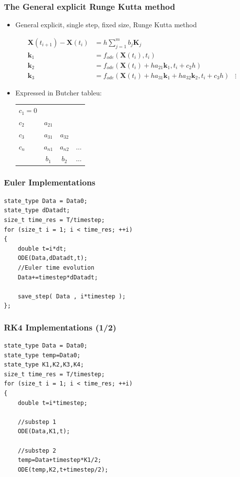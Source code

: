 \documentclass{beamer}
\begin{document}
\begin{frame}
\frametitle{The General explicit Runge Kutta method}
\begin{itemize}

\item<1-> General explicit, single step, fixed size, Runge Kutta method

\begin{align*}
\mathbf{X}(t_{i+1})-\mathbf{X}(t_{i}) &=  h \sum_{j=1}^{m} b_j \mathbf{K}_j\\
\mathbf{k}_1 &= f_{ode}(\mathbf{X}(t_i),t_i)\\
\mathbf{k}_2 &= f_{ode}(\mathbf{X}(t_i)+ha_{21} \mathbf{k}_1,t_i+c_2 h)\\
\mathbf{k}_3 &= f_{ode}(\mathbf{X}(t_i)+ha_{31} \mathbf{k}_1+ha_{32} \mathbf{k}_2,t_i+c_3 h)
&\vdots
\end{align*}

\item<2-> Expressed in Butcher tableu:

\begin{tabular}{l | @{\quad} c @{\quad} c @{\quad} c}
$c_1=0$ \\
$c_2$ & $a_{21}$\\
$c_3$ & $a_{31}$ &  $a_{32}$\\
$c_n$ & $a_{n1}$ &  $a_{n2}$ & $\hdots$\\
\midrule
& $b_1$ & $b_2$ & $\hdots$
\end{tabular}


\end{itemize}
\end{frame}


\begin{frame}[fragile]
\frametitle{Euler Implementations}
\begin{lstlisting}
state_type Data = Data0;
state_type dDatadt;
size_t time_res = T/timestep;
for (size_t i = 1; i < time_res; ++i)
{
    double t=i*dt;
    ODE(Data,dDatadt,t);
    //Euler time evolution
    Data+=timestep*dDatadt;

    save_step( Data , i*timestep );
};
\end{lstlisting}
\end{frame}





\begin{frame}[fragile]
\frametitle{RK4 Implementations (1/2)}
\begin{lstlisting}
state_type Data = Data0;
state_type temp=Data0;
state_type K1,K2,K3,K4;
size_t time_res = T/timestep;
for (size_t i = 1; i < time_res; ++i)
{
    double t=i*timestep;

    //substep 1
    ODE(Data,K1,t);

    //substep 2
    temp=Data+timestep*K1/2;
    ODE(temp,K2,t+timestep/2);
\end{lstlisting}
\end{frame}
\end{document}
